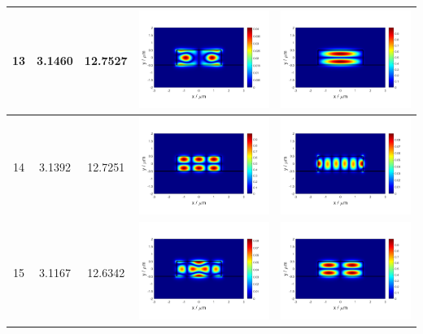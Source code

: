\documentclass{assignment}
\begin{document}
\begin{sol}
\begin{itemize}
\begin{longtable}[c]{|c|c|c|c|c|}
            13 & 3.1460 & 12.7527 & \includegraphics[width=.3\columnwidth]{Assignment-2-mode-13-Ex.png} & \includegraphics[width=.3\columnwidth]{Assignment-2-mode-13-Ey.png} \\ \hline
            14 & 3.1392 & 12.7251 & \includegraphics[width=.3\columnwidth]{Assignment-2-mode-14-Ex.png} & \includegraphics[width=.3\columnwidth]{Assignment-2-mode-14-Ey.png} \\ \hline
            15 & 3.1167 & 12.6342 & \includegraphics[width=.3\columnwidth]{Assignment-2-mode-15-Ex.png} & \includegraphics[width=.3\columnwidth]{Assignment-2-mode-15-Ey.png} \\ \hline

\end{longtable}
\end{itemize}
\end{sol}
\end{document}
